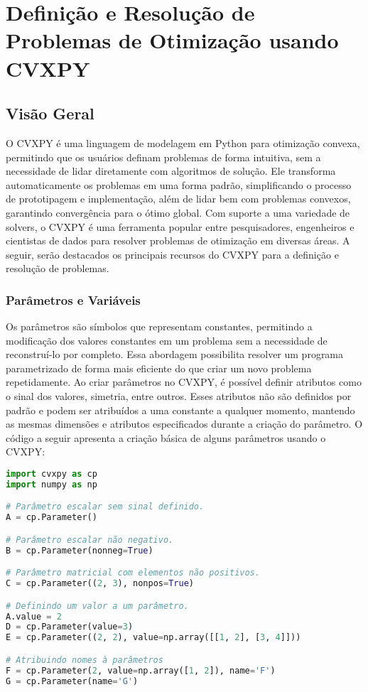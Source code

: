 \chapter{Definição e Resolução de Problemas de Otimização usando CVXPY}\label{apendiceB}

\section{Visão Geral}

O CVXPY é uma linguagem de modelagem em Python para otimização convexa, permitindo que os usuários definam problemas de forma intuitiva, sem a necessidade de lidar diretamente com algoritmos de solução. Ele transforma automaticamente os problemas em uma forma padrão, simplificando o processo de prototipagem e implementação, além de lidar bem com problemas convexos, garantindo convergência para o ótimo global. Com suporte a uma variedade de solvers, o CVXPY é uma ferramenta popular entre pesquisadores, engenheiros e cientistas de dados para resolver problemas de otimização em diversas áreas. A seguir, serão destacados os principais recursos do CVXPY para a definição e resolução de problemas.

\subsection{Parâmetros e Variáveis}

Os parâmetros são símbolos que representam constantes, permitindo a modificação dos valores constantes em um problema sem a necessidade de reconstruí-lo por completo. Essa abordagem possibilita resolver um programa parametrizado de forma mais eficiente do que criar um novo problema repetidamente. Ao criar parâmetros no CVXPY, é possível definir atributos como o sinal dos valores, simetria, entre outros. Esses atributos não são definidos por padrão e podem ser atribuídos a uma constante a qualquer momento, mantendo as mesmas dimensões e atributos especificados durante a criação do parâmetro. O código a seguir apresenta a criação básica de alguns parâmetros usando o CVXPY:

\vspace{8pt}
\begin{lstlisting}[language=Python, caption={Criação de parâmetros usando CVXPY.}]
import cvxpy as cp
import numpy as np

# Parâmetro escalar sem sinal definido.
A = cp.Parameter()

# Parâmetro escalar não negativo.
B = cp.Parameter(nonneg=True)

# Parâmetro matricial com elementos não positivos.
C = cp.Parameter((2, 3), nonpos=True)

# Definindo um valor a um parâmetro.
A.value = 2
D = cp.Parameter(value=3)
E = cp.Parameter((2, 2), value=np.array([[1, 2], [3, 4]]))

# Atribuindo nomes à parâmetros 
F = cp.Parameter(2, value=np.array([1, 2]), name='F')
G = cp.Parameter(name='G')

\end{lstlisting}

